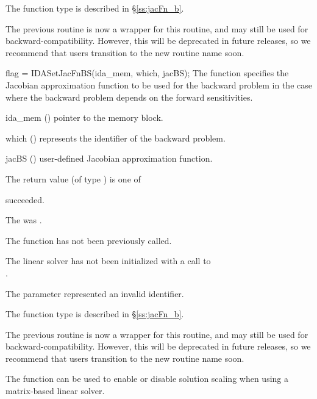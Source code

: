 {
  The function type  is described in \S\ref{ss:jacFn_b}.

  The previous routine  is now a wrapper for this
  routine, and may still be used for backward-compatibility.  However,
  this will be deprecated in future releases, so we recommend that
  users transition to the new routine name soon.
}
{
  flag = IDASetJacFnBS(ida\_mem, which, jacBS);
}
{
  The function  specifies the Jacobian
  approximation function to be used for the backward problem in the case
  where the backward problem depends on the forward sensitivities.
}
{
  \begin{args}
  \item[ida\_mem] ()
    pointer to the {\idas} memory block.
  \item[which] ()
    represents the identifier of the backward problem.
  \item[jacBS] ()
    user-defined Jacobian approximation function.
  \end{args}
}
{
  The return value  (of type ) is one of
  \begin{args}
  \item[\Id{IDALS\_SUCCESS}]
     succeeded.
  \item[\Id{IDALS\_MEM\_NULL}]
    The  was .
  \item[\Id{IDALS\_NO\_ADJ}]
    The function  has not been previously called.
  \item[\Id{IDALS\_LMEM\_NULL}]
    The linear solver has not been initialized with a call to \\ \noindent
    .
  \item[\Id{IDALS\_ILL\_INPUT}]
    The parameter  represented an invalid identifier.
  \end{args}
}
{
  The function type  is described in \S\ref{ss:jacFn_b}.

  The previous routine  is now a wrapper for this
  routine, and may still be used for backward-compatibility.  However,
  this will be deprecated in future releases, so we recommend that
  users transition to the new routine name soon.
}
The function  can be used to enable or
disable solution scaling when using a matrix-based linear solver.
